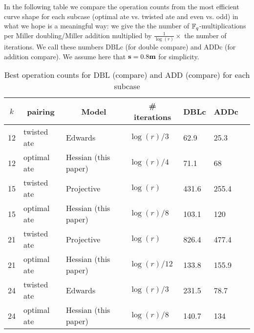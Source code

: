 In the following table we compare the operation counts from the most efficient 
curve shape for each subcase
(optimal ate vs. twisted ate and even vs. odd)
in what we hope is a meaningful way:
we give the the number of $\mathbb{F}_{q}$-multiplications per Miller doubling/Miller addition multiplied by 
$\frac{1}{\log(r)} \times $ the number of iterations. We call these numbers DBLc 
(for double compare) and ADDc (for addition compare).
We assume here that $\textbf{s} = 0.8\textbf{m}$ for simplicity.

\begin{table}[h]
\centering
\caption{Best operation counts for DBL (compare) and ADD (compare) for each subcase}

\begin{tabular}{|l| l| l| l| l| l| l|}
\hline
\multicolumn{1}{|c|}{$k$}
&\multicolumn{1}{|c|}{pairing} 
&\multicolumn{1}{|c|}{Model}
&\multicolumn{1}{|c|}{\# iterations}
&\multicolumn{1}{|c|}{DBLc}	
&\multicolumn{1}{|c|}{ADDc}	
\\
\hline
12 & twisted ate & Edwards \cite{2014/LWZ} & $\log(r)/3$ &
62.9 & 25.3 \\
12 & optimal ate & Hessian (this paper) & $\log(r)/4$ &
71.1 & 68 \\
\hline
15 & twisted ate & Projective \cite{2009/craig} & $\log(r)$ &
431.6 & 255.4 \\
15 & optimal ate & Hessian (this paper) & $\log(r)/8$ &
103.1 & 120 \\
\hline
21 & twisted ate & Projective \cite{2009/craig} & $\log(r)$ &
826.4 & 477.4 \\
21 & optimal ate & Hessian (this paper) & $\log(r)/12$ &
133.8 & 155.9 \\
\hline
24 & twisted ate & Edwards \cite{2014/LWZ} & $\log(r)/3$ &
231.5 & 78.7 \\
24 & optimal ate & Hessian (this paper) & $\log(r)/8$ &
140.7 & 134 \\ \hline
\end{tabular}
\label{tbl-cmp1}
\end{table}


